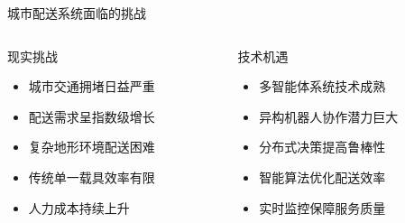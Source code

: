 \documentclass[
10pt,
aspectratio=169,
]{beamer}
\begin{document}
\begin{frame}{城市配送系统面临的挑战}
    \begin{columns}
        \begin{column}{0.5\textwidth}
            \begin{block}{现实挑战}
                \begin{itemize}
                    \item 城市交通拥堵日益严重
                    \item 配送需求呈指数级增长
                    \item 复杂地形环境配送困难
                    \item 传统单一载具效率有限
                    \item 人力成本持续上升
                \end{itemize}
            \end{block}
        \end{column}
        \begin{column}{0.5\textwidth}
            \begin{alertblock}{技术机遇}
                \begin{itemize}
                    \item 多智能体系统技术成熟
                    \item 异构机器人协作潜力巨大
                    \item 分布式决策提高鲁棒性
                    \item 智能算法优化配送效率
                    \item 实时监控保障服务质量
                \end{itemize}
            \end{alertblock}
        \end{column}
    \end{columns}
\end{frame}
\end{document}
